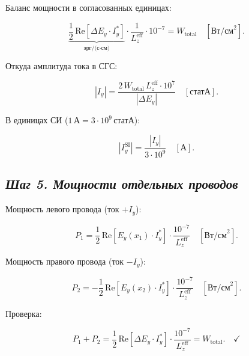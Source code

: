\documentclass[11pt]{article}
\begin{document}
Баланс мощности в согласованных единицах:

\begin{equation*}
    \underbrace{\frac{1}{2}\,\mathrm{Re}[\Delta E_y \cdot I_y^*]}_{\text{эрг/(с·см)}}
    \cdot \frac{1}{L_z^{\text{eff}}} \cdot 10^{-7}
    = W_{\text{total}} \quad [\text{Вт/см}^2].
\end{equation*}

Откуда амплитуда тока в СГС:

\begin{equation}
    \boxed{
        |I_y| = \frac{2\,W_{\text{total}}\,L_z^{\text{eff}} \cdot 10^7}{|\Delta E_y|}
        \quad [\text{статА}].
    }
    \label{eq:I_y_units}
\end{equation}

В единицах СИ (\(1\,\text{А} = 3\cdot10^9\,\text{статА}\)):

\begin{equation*}
    |I_y^{\text{SI}}| = \frac{|I_y|}{3 \cdot 10^9} \quad [\text{А}].
\end{equation*}

    \subsection{\texorpdfstring{\emph{Шаг 5. Мощности отдельных
проводов}}{Шаг 5. Мощности отдельных проводов}}\label{ux448ux430ux433-5.-ux43cux43eux449ux43dux43eux441ux442ux438-ux43eux442ux434ux435ux43bux44cux43dux44bux445-ux43fux440ux43eux432ux43eux434ux43eux432}

Мощность левого провода (ток \(+I_y\)):

\begin{equation*}
    P_1 = \frac{1}{2}\,\mathrm{Re}[E_y(x_1)\cdot I_y^*]
    \cdot \frac{10^{-7}}{L_z^{\text{eff}}}
    \quad [\text{Вт/см}^2].
\end{equation*}

Мощность правого провода (ток \(-I_y\)):

\begin{equation*}
    P_2 = -\frac{1}{2}\,\mathrm{Re}[E_y(x_2)\cdot I_y^*]
    \cdot \frac{10^{-7}}{L_z^{\text{eff}}}
    \quad [\text{Вт/см}^2].
\end{equation*}

Проверка:

\begin{equation*}
    P_1 + P_2
    = \frac{1}{2}\,\mathrm{Re}[\Delta E_y \cdot I_y^*]
    \cdot \frac{10^{-7}}{L_z^{\text{eff}}}
    = W_{\text{total}}. \quad \checkmark
\end{equation*}
\end{document}
